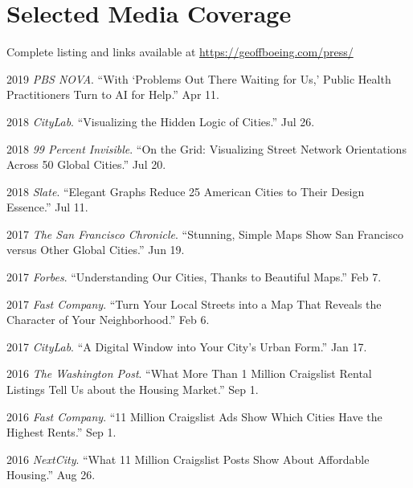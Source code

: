 \documentclass[12pt,letterpaper]{report}
\begin{document}
    \section*{Selected Media Coverage}

    Complete listing and links available at \href{https://geoffboeing.com/press/}{https://geoffboeing.com/press/} \bigskip

    \begin{tablist}

        \item[2019] \tab \textit{PBS NOVA}. \enquote{With \enquote{Problems Out There Waiting for Us,} Public Health Practitioners Turn to AI for Help.} Apr 11.
        
        \item[2018] \tab \textit{CityLab}. \enquote{Visualizing the Hidden Logic of Cities.} Jul 26.

        \item[2018] \tab \textit{99 Percent Invisible}. \enquote{On the Grid: Visualizing Street Network Orientations Across 50 Global Cities.} Jul 20.

        \item[2018] \tab \textit{Slate}. \enquote{Elegant Graphs Reduce 25 American Cities to Their Design Essence.} Jul 11.

        \item[2017] \tab \textit{The San Francisco Chronicle}. \enquote{Stunning, Simple Maps Show San Francisco versus Other Global Cities.} Jun 19.

        \item[2017] \tab \textit{Forbes}. \enquote{Understanding Our Cities, Thanks to Beautiful Maps.} Feb 7.

        \item[2017] \tab \textit{Fast Company}. \enquote{Turn Your Local Streets into a Map That Reveals the Character of Your Neighborhood.} Feb 6.

        \item[2017] \tab \textit{CityLab}. \enquote{A Digital Window into Your City's Urban Form.} Jan 17.

        \item[2016] \tab \textit{The Washington Post}. \enquote{What More Than 1 Million Craigslist Rental Listings Tell Us about the Housing Market.} Sep 1.

        \item[2016] \tab \textit{Fast Company}. \enquote{11 Million Craigslist Ads Show Which Cities Have the Highest Rents.} Sep 1.

        \item[2016] \tab \textit{NextCity}. \enquote{What 11 Million Craigslist Posts Show About Affordable Housing.} Aug 26.

    \end{tablist}
\end{document}
